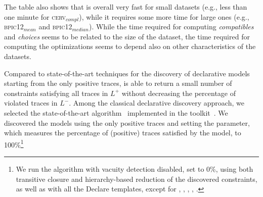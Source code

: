 The table also shows that \nd is overall very fast for small datasets (e.g., less than one minute for \textsc{cerv$_{compl}$}), while it requires some more time for large ones (e.g., \textsc{bpic12$_{mean}$} and \textsc{bpic12$_{median}$}). While the time required for computing \textit{compatibles} and \textit{choices} seems to be related to the size of the dataset, the time required for computing the optimizations seems to depend also on other characteristics of the datasets. 



Compared to state-of-the-art techniques for the discovery of declarative models starting from the only positive traces, \nd is able to return a small number of constraints satisfying all traces in $L^+$ without decreasing the percentage of violated traces in $L^-$.  
Among the classical declarative discovery approach, we selected the state-of-the-art \declareminer algorithm~\cite{2018a-Maggi} implemented in the \rum toolkit~\cite{2020-Alman}. We discovered the models using the only positive traces and setting the  parameter, which measures the percentage of (positive) traces satisfied by the \declare model, to 100\%\footnote{We run the \declareminer algorithm with vacuity detection disabled,  set to 0\%, using both transitive closure and hierarchy-based reduction of the discovered constraints, as well as with all the Declare templates, except for , , , , .}

